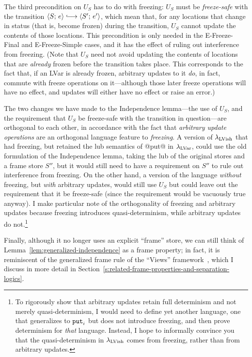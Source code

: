 The third precondition on $U_S$ has to do with freezing: $U_S$ must be
\emph{freeze-safe} with the transition $\config{S}{e} \parstepsto
\config{S'}{e'}$, which mean that, for any locations that change in
status (that is, become frozen) during the transition, $U_S$ cannot
update the contents of those locations.  This precondition is only
needed in the {\sc E-Freeze-Final} and {\sc E-Freeze-Simple} cases,
and it has the effect of ruling out interference from freezing.  (Note
that $U_S$ need not avoid updating the contents of locations that are
\emph{already} frozen before the transition takes place.  This
corresponds to the fact that, if an LVar is already frozen, arbitrary
updates to it \emph{do}, in fact, commute with freeze operations on
it---although those later freeze operations will have no effect, and
updates will either have no effect or raise an error.)

\DefFreezeSafe

The two changes we have made to the Independence lemma---the use of
$U_S$, and the requirement that $U_S$ be freeze-safe with the
transition in question---are orthogonal to each other, in accordance
with the fact that \emph{arbitrary update operations} are an
orthogonal language feature to \emph{freezing}.  A version of
$\lambda_{\textrm{LVish}}$ that had freezing, but retained the lub semantics of
@put@ in $\lambda_{\textrm{LVar}}$, could use the old formulation of the
Independence lemma, taking the lub of the original stores and a frame
store $S''$, but it would still need to have a requirement on $S''$ to
rule out interference from freezing.  On the other hand, a version of
the language \emph{without} freezing, but \emph{with} arbitrary
updates, would still use $U_S$ but could leave out the requirement
that it be freeze-safe (since the requirement would be vacuously true
anyway).  I make particular note of the orthogonality of freezing and
arbitrary updates because freezing introduces quasi-determinism, while
arbitrary updates do not.\footnote{To rigorously show that arbitrary
  updates retain full determinism and not merely quasi-determinism, I
  would need to define yet another language, one that generalizes
   to $\mbox{\texttt{put}}_i$ but does not introduce freezing, and then prove
  determinism for \emph{that} language.  Instead, I hope to informally
  convince you that the quasi-determinism in $\lambda_{\textrm{LVish}}$ comes from
  freezing, rather than from arbitrary updates.}

Finally, although it no longer uses an explicit ``frame'' store, we
can still think of Lemma~\ref{lem:generalized-independence} as a frame
property; in fact, it is reminiscent of the generalized frame rule of
the ``Views'' framework~\cite{views}, which I discuss in more detail
in Section~\ref{s:related-frame-properties-and-separation-logics}.

